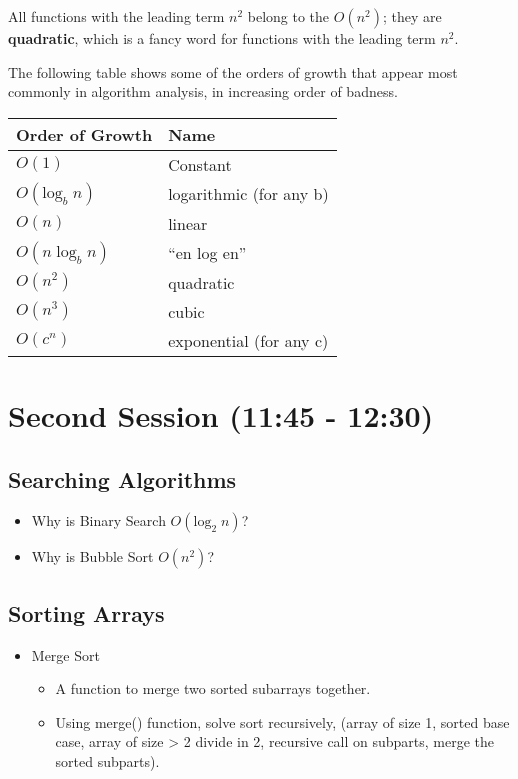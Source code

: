 \documentclass[11pt]{article}
\begin{document}
All functions with the leading term $n^2$ belong to the $O(n^2)$;
they are \textbf{quadratic}, which is a fancy word for functions with
the leading term $n^2$.

The following table shows some of the orders of growth that appear most commonly
in algorithm analysis, in increasing order of badness.


\begin{center}
\begin{tabular}{ll}
 Order of Growth                &  Name                     \\
\hline
 $O(1)$                         &  Constant                 \\
 $O(\mathrm{log}_b \; n)$       &  logarithmic (for any b)  \\
 $O(n)$                         &  linear                   \\
 $O(n \; \mathrm{log}_b \; n)$  &  ``en log en''            \\
 $O(n^2)$                       &  quadratic                \\
 $O(n^3)$                       &  cubic                    \\
 $O(c^n)$                       &  exponential (for any c)  \\
\end{tabular}
\end{center}
\section{Second Session (11:45 - 12:30)}
\label{sec-2}
\subsection{Searching Algorithms}
\label{sec-2-1}

\begin{itemize}
\item Why is Binary Search $O(\mathrm{log}_2 \; n)$?
\item Why is Bubble Sort $O(n^2)$?
\end{itemize}
\subsection{Sorting Arrays}
\label{sec-2-2}

\begin{itemize}
\item Merge Sort
\begin{itemize}
\item A function to merge two sorted subarrays together.
\item Using merge() function, solve sort recursively, (array of size 1, sorted base
    case, array of size > 2 divide in 2, recursive call on subparts, merge the sorted
    subparts).
\end{itemize}
\end{itemize}
\end{document}
